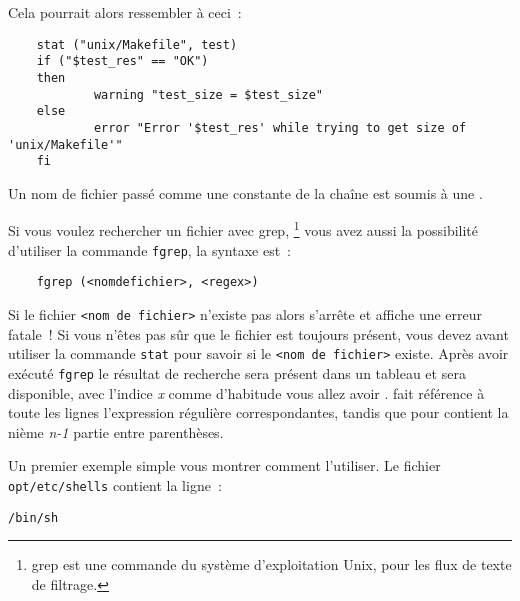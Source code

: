     Cela pourrait alors ressembler à ceci~:

\begin{example}
\begin{verbatim}
    stat ("unix/Makefile", test)
    if ("$test_res" == "OK")
    then
            warning "test_size = $test_size"
    else
            error "Error '$test_res' while trying to get size of 'unix/Makefile'"
    fi
\end{verbatim}
\end{example}

    Un nom de fichier passé comme une constante de la chaîne est soumis à une
	.



    Si vous voulez rechercher un fichier avec \og{}grep\fg{},
    \footnote{\og{}grep\fg{} est une commande du système d'exploitation Unix,
	pour les flux de texte de filtrage.} vous avez aussi la possibilité d'utiliser
	la commande \texttt{fgrep}, la syntaxe est~:

\begin{example}
\begin{verbatim}
    fgrep (<nomdefichier>, <regex>)
\end{verbatim}
\end{example}

    Si le fichier \texttt{<nom de fichier>} n'existe pas alors  s’arrête
	et affiche une erreur fatale~! Si vous n'êtes pas sûr que le fichier est toujours
	présent, vous devez avant utiliser la commande \texttt{stat} pour savoir si le
	\texttt{<nom de fichier>} existe. Après avoir exécuté \texttt{fgrep} le résultat de
	recherche sera présent dans un tableau et  sera disponible, avec
	l'indice \emph{x} comme d'habitude vous allez avoir .
	 fait référence à toute les lignes l'expression régulière
	correspondantes, tandis que  pour 
	contient la nième \emph{n-1} partie entre parenthèses.

    Un premier exemple simple vous montrer comment l'utiliser. Le fichier
	\texttt{opt/etc/shells} contient la ligne~:

\begin{example}
\begin{verbatim}
/bin/sh
\end{verbatim}
\end{example}

